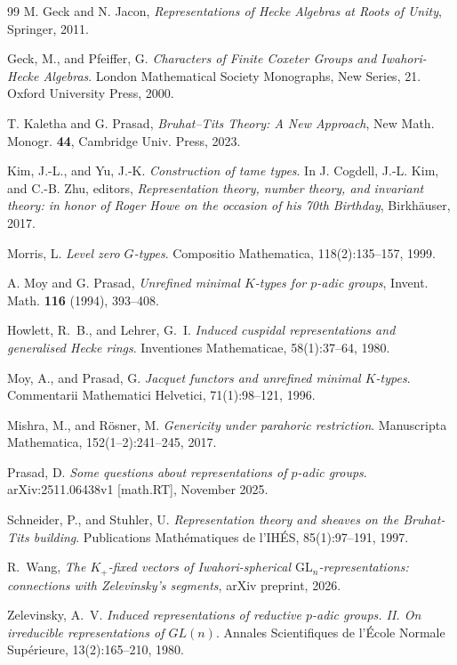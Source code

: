 \documentclass[12pt]{article}
\theoremstyle{remark}
\begin{document}
\begin{thebibliography}{99}
M. Geck and N. Jacon, \emph{Representations of Hecke Algebras at Roots of Unity}, Springer, 2011.

Geck, M., and Pfeiffer, G.
\emph{Characters of Finite Coxeter Groups and Iwahori-Hecke Algebras}.
London Mathematical Society Monographs, New Series, 21. Oxford University Press, 2000.

T. Kaletha and G. Prasad, \emph{Bruhat–Tits Theory: A New Approach}, New Math. Monogr. \textbf{44}, Cambridge Univ. Press, 2023.

Kim, J.-L., and Yu, J.-K.
\emph{Construction of tame types}.
In J. Cogdell, J.-L. Kim, and C.-B. Zhu, editors,
\emph{Representation theory, number theory, and invariant theory: in honor of Roger Howe on the occasion of his 70th Birthday},
Birkh\"auser, 2017.

Morris, L.
\emph{Level zero $G$-types}.
Compositio Mathematica, 118(2):135--157, 1999.

A. Moy and G. Prasad, \emph{Unrefined minimal $K$-types for $p$-adic groups}, Invent. Math. \textbf{116} (1994), 393–408.

Howlett, R.~B., and Lehrer, G.~I.
\emph{Induced cuspidal representations and generalised Hecke rings}.
Inventiones Mathematicae, 58(1):37--64, 1980.

Moy, A., and Prasad, G.
\emph{Jacquet functors and unrefined minimal $K$-types}.
Commentarii Mathematici Helvetici, 71(1):98--121, 1996.

Mishra, M., and R\"osner, M.
\emph{Genericity under parahoric restriction}.
Manuscripta Mathematica, 152(1--2):241--245, 2017.

Prasad, D.
\emph{Some questions about representations of $p$-adic groups}.
arXiv:2511.06438v1 [math.RT], November 2025.

Schneider, P., and Stuhler, U.
\emph{Representation theory and sheaves on the Bruhat-Tits building}.
Publications Math\'ematiques de l'IH\'ES, 85(1):97--191, 1997.

R.~Wang,
\emph{The $K_+$-fixed vectors of Iwahori-spherical
$\mathrm{GL}_n$-representations: connections with Zelevinsky's segments},
arXiv preprint, 2026.

Zelevinsky, A.~V.
\emph{Induced representations of reductive $p$-adic groups. II. On irreducible representations of $GL(n)$}.
Annales Scientifiques de l'\'Ecole Normale Sup\'erieure, 13(2):165--210, 1980.

\end{thebibliography}
\end{document}

